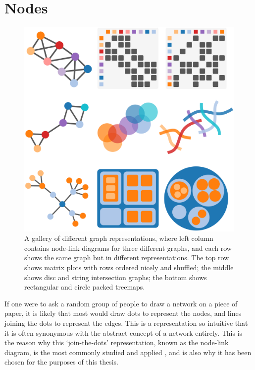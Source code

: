 \chapter{Nodes}
\label{chap:stress}
\begin{figure}
  \centering
  \includegraphics[width=\textwidth]{stress/representations.pdf}
  \caption[A gallery of graph representations]{A gallery of different graph representations, where left column contains node-link diagrams for three different graphs, and each row shows the same graph but in different representations. The top row shows matrix plots with rows ordered nicely and shuffled; the middle shows disc and string intersection graphs; the bottom shows rectangular and circle packed treemaps.
  }
  \label{fig:graph_representations}
\end{figure}

If one were to ask a random group of people to draw a network on a piece of paper, it is likely that most would draw dots to represent the nodes, and lines joining the dots to represent the edges. This is a representation so intuitive that it is often synonymous with the abstract concept of a network entirely.
This is the reason why this `join-the-dots' representation, known as the node-link diagram, is the most commonly studied and applied \cite{Ghoniem2004}, and is also why it has been chosen for the purposes of this thesis.

